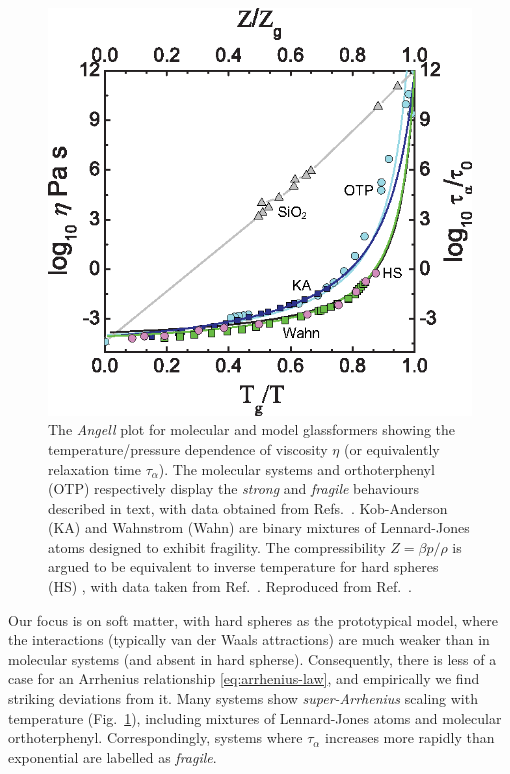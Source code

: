 \documentclass[11pt,twoside]{report}
\begin{document}
\begin{figure}
  \includegraphics[width=0.9\linewidth,outer]{angell}
  \caption[Angell plot]{
    The \emph{Angell} plot \cite{AngellJNS1988} for molecular and model glassformers showing the temperature/pressure dependence of viscosity $\eta$ (or equivalently relaxation time $\tau_\alpha$).
    The molecular systems  and orthoterphenyl (OTP) respectively display the \emph{strong} and \emph{fragile} behaviours described in text, with data obtained from Refs.\ \cite{AngellS1995, BerthierPRE2009}.
    Kob-Anderson (KA) and Wahnstrom (Wahn) are binary mixtures of Lennard-Jones atoms designed to exhibit fragility.
    The compressibility $Z = \beta p / \rho$ is argued to be equivalent to inverse temperature for hard spheres (HS) \cite{BerthierPRE2009}, with data taken from Ref.\ \cite{RoyallJSM2017}.
    Reproduced from Ref.\ \cite{RoyallPR2015}.
  }
  \label{fig:angell}
\end{figure}

Our focus is on soft matter, with hard spheres as the prototypical model, where the  interactions (typically van der Waals attractions) are much weaker than in molecular systems (and absent in hard spherse).
Consequently, there is less of a case for an Arrhenius relationship \eqref{eq:arrhenius-law}, and empirically we find striking deviations from it.
Many systems show \emph{super-Arrhenius} scaling with temperature (Fig.\ \ref{fig:angell}), including mixtures of Lennard-Jones atoms and molecular orthoterphenyl.
Correspondingly, systems where $\tau_\alpha$ increases more rapidly than exponential are labelled as \emph{fragile}.
\end{document}
